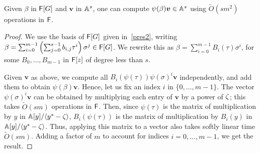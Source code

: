 \begin{lemma}\label{lem:multpsi}
  Given $\beta$ in ${\mathsf{F}}[G]$ and $\boldsymbol{v}$ in $\mathbb{A}^s$, one can
  compute $\psi(\beta) \boldsymbol{v} \in \mathbb{A}^s$ using $\tilde{O}(s
  m^2)$ operations in ${\mathsf{F}}$.
\end{lemma}
\begin{proof}
  We use the basis of ${\mathsf{F}}[G]$ given in~\eqref{pres2}, writing $\beta =
  \sum_{i = 0}^{m-1} \left( \sum_{j = 0}^{s-1}  b_{i,j} \tau^i
  \right) \sigma^j \in {\mathsf{F}}[G]$. We rewrite this as $\beta = \sum_{i
    = 0}^{m-1} B_i(\tau) \sigma^i$, for some $B_0,\dots,B_{m-1}$ in
  ${\mathsf{F}}[z]$ of degree less than $s$.

 Given $\boldsymbol{v}$ as above, we compute all $B_i(\psi(\tau))
 \psi(\sigma)^i \boldsymbol{v}$ independently, and add them to obtain
 $\psi(\beta) \boldsymbol{v}$. Hence, let us fix an index $i$ in
 $\{0,\dots,m-1\}$.
 The vector $\psi(\sigma)^i \boldsymbol{v}$ can be obtained by
 multiplying each entry of $\boldsymbol{v}$ by a power of $\zeta$;
 this takes $\tilde{O}(sm)$ operations in ${\mathsf{F}}$. Then, since
 $\psi(\tau)$ is the matrix of multiplication by $y$ in $\mathbb{A}[y]/\langle
 y^s-\zeta\rangle$, $B_i(\psi(\tau))$ is the matrix of multiplication
 by $B_i(y)$ in $\mathbb{A}[y]/\langle y^s-\zeta\rangle$. Thus, applying this
 matrix to a vector also takes softly linear time $\tilde{O}(sm)$.
 Adding a factor of $m$ to account for indices $i=0,\dots,m-1$, we get 
 the result.
\end{proof}






